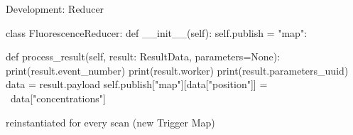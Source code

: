 \documentclass[aspectratio=169]{beamer}
\begin{document}
\begin{frame}[fragile]{Development: Reducer}
 \begin{python}
class FluorescenceReducer:
    def __init__(self):
        self.publish = {"map": {}}

    def process_result(self,
                      result: ResultData,
                      parameters=None):
        print(result.event_number)
        print(result.worker)
        print(result.parameters_uuid)
        data = result.payload
        self.publish["map"][data["position"]] = \
                data["concentrations"]
\end{python}

reinstantiated for every scan (new Trigger Map)

\end{frame}
\end{document}
